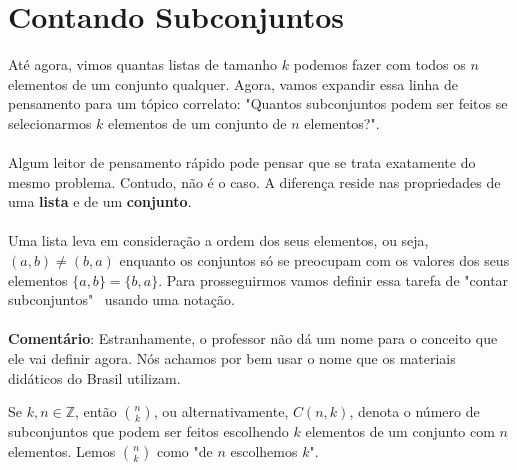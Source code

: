 \documentclass[main.tex]{subfiles}
\begin{document}
\section{Contando Subconjuntos}

Até agora, vimos quantas listas de tamanho $k$ podemos fazer com todos os $n$ elementos de um conjunto qualquer. Agora, vamos expandir essa linha de pensamento para um tópico correlato: "Quantos subconjuntos podem ser feitos se selecionarmos $k$ elementos de um conjunto de $n$ elementos?". 
\\~\\
Algum leitor de pensamento rápido pode pensar que se trata exatamente do mesmo problema. Contudo, não é o caso. A diferença reside nas propriedades de uma \textbf{lista} e de um \textbf{conjunto}.
\\~\\
Uma lista leva em consideração a ordem dos seus elementos, ou seja, $(a,b) \neq (b,a)$ enquanto os conjuntos só se preocupam com os valores dos seus elementos $\{a,b\} = \{b,a\}$. Para prosseguirmos vamos definir essa tarefa de "contar subconjuntos" \ usando uma notação.
\\~\\
\textbf{Comentário}: Estranhamente, o professor não dá um nome para o conceito que ele vai definir agora. Nós achamos por bem usar o nome que os materiais didáticos do Brasil utilizam.

\begin{definition}[Combinação]
Se $k,n \in \mathbb{Z}$, então $n \choose k$, ou alternativamente, $C(n,k)$, denota o número de subconjuntos que podem ser feitos escolhendo $k$ elementos de um conjunto com $n$ elementos. Lemos $n \choose k$ como "de $n$ escolhemos $k$".
\end{definition}
\end{document}
